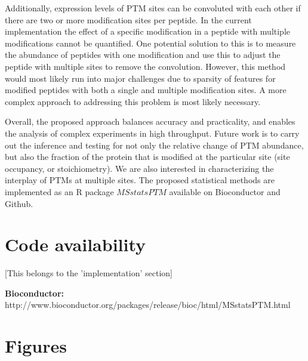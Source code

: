 \documentclass[mcp]{article}
\numberwithin{figure}{section} %
\numberwithin{table}{section}
\def\todo#1{{\color{red}[#1]}}
\begin{document}
Additionally, expression levels of PTM sites can be convoluted with each other if there are two or more modification sites per peptide. In the current implementation the effect of a specific modification in a peptide with multiple modifications cannot be quantified. One potential solution to this is to measure the abundance of peptides with one modification and use this to adjust the peptide with multiple sites to remove the convolution. However, this method would most likely run into major challenges due to sparsity of features for modified peptides with both a single and multiple modification sites. A more complex approach to addressing this problem is most likely necessary.

Overall, the proposed approach balances accuracy and practicality, and enables the analysis of complex experiments in high throughput. Future work is to carry out the inference and testing for not only the relative change of PTM abundance, but also the fraction of the protein that is modified at the particular site (site occupancy, or stoichiometry). We are also interested in characterizing the interplay of PTMs at multiple sites. The proposed statistical methods are implemented as an R package $MSstatsPTM$ available on Bioconductor and Github.

\section{Code availability}

\todo{This belongs to the 'implementation' section}

{ \bf Bioconductor:} http://www.bioconductor.org/packages/release/bioc/html/MSstatsPTM.html



\newpage
\printbibliography


\newpage
\section{Figures}
\end{document}
